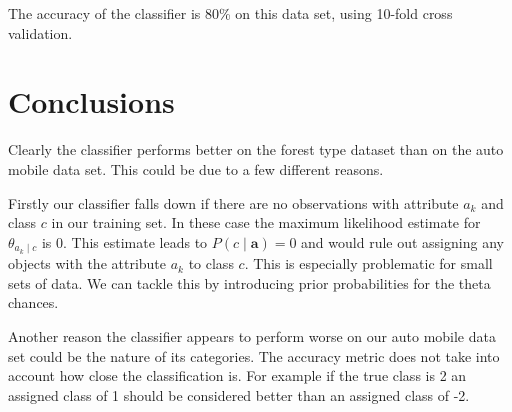 The accuracy of the classifier is 80\% on this data set, using 10-fold cross validation.

\section{Conclusions}

Clearly the classifier performs better on the forest type dataset than on the auto mobile data set. This could be due to a few different reasons.

Firstly our classifier falls down if there are no observations with attribute $a_k$ and class $c$ in our training set. In these case the maximum likelihood estimate for $\theta_{a_k \mid c}$ is 0. This estimate leads to $P(c \mid \mathbf{a}) = 0$ and would rule out assigning any objects with the attribute $a_k$ to class $c$. This is especially problematic for small sets of data. We can tackle this by introducing prior probabilities for the theta chances.

Another reason the classifier appears to perform worse on our auto mobile data set could be the nature of its categories. The accuracy metric does not take into account how close the classification is. For example if the true class is 2 an assigned class of 1 should be considered better than an assigned class of -2.

